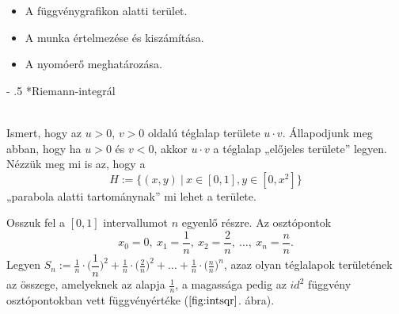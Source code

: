 \documentclass[12pt,margin=0px]{article}
\makeatletter
\newcommand\ddfrac[2]{\frac{\displaystyle #1}{\displaystyle #2}}
\renewcommand\paragraph{%
	\@startsection{paragraph}{4}{0mm}%
	{-\baselineskip}%
	{.5\baselineskip}%
	{\normalfont\normalsize\bfseries}}
\makeatother
\begin{document}
    \begin{itemize}
        \item A függvénygrafikon alatti terület.
        \item A munka értelmezése és kiszámítása.
        \item A nyomóerő meghatározása.\\
    \end{itemize}

    \paragraph*{Riemann-integrál}

    {\footnotesize \noindent {\color{blue} \faLightbulbO\ $\triangleright$ } }
    {\footnotesize\\
    \noindent Ismert, hogy az $u > 0$, $v > 0$ oldalú téglalap területe $u\cdot v$. Állapodjunk meg abban, hogy ha $u > 0$ és $v < 0$, akkor $u\cdot v$ a téglalap „előjeles területe” legyen.\\  Nézzük meg mi is az, hogy a
    \[
        H := \Big\{(x, y)\ \big|\ x \in [0, 1], y \in [0, x^2]\Big\}
    \]
    „parabola alatti tartománynak” mi lehet a területe.

    \noindent Osszuk fel a $[0, 1]$ intervallumot $n$ egyenlő részre. Az osztópontok
    \[
        x_0 = 0,\ x_1 = \ddfrac{1}{n},\ x_2 = \ddfrac{2}{n},\ \ldots,\ x_n = \ddfrac{n}{n}.
    \]
    Legyen $S_n := \ddfrac{1}{n} \cdot \Big(\dfrac{1}{n}\Big)^2 + \ddfrac{1}{n} \cdot \Big(\ddfrac{2}{n}\Big)^2 + \ldots + \ddfrac{1}{n} \cdot \Big(\ddfrac{n}{n}\Big)^n$, azaz olyan téglalapok területének az összege, amelyeknek az alapja $\ddfrac{1}{n}$, a magassága pedig az $id^2$ függvény osztópontokban vett függvényértéke ($\ref{fig:intsqr}$. ábra).\\

    \begin{figure}[H]
    	\centering
        \begin{center}
        \end{center}
        \caption{}
        \label{fig:intsqr}
    \end{figure}

}
\end{document}
